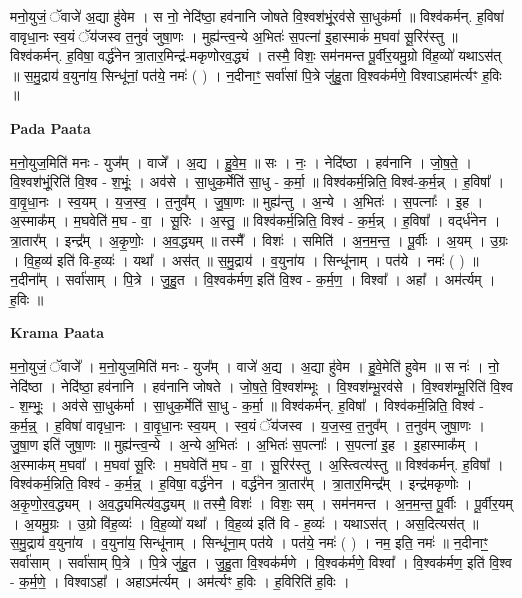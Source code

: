 \documentclass[17pt]{extarticle}
\begin{document}
मनो॒युजं॒ ॅवाजे॑ अ॒द्या हु॑वेम । स नो॒ नेदि॑ष्ठा॒ हव॑नानि जोषते वि॒श्वश॑भूं॒रव॑से सा॒धुक॑र्मा ॥ विश्व॑कर्मन्. ह॒विषा॑ वावृधा॒नः स्व॒यं ॅय॑जस्व त॒नुवं॑ जुषा॒णः । मुह्य॑न्त्व॒न्ये अ॒भितः॑ स॒पत्ना॑ इ॒हास्माकं॑ म॒घवा॑ सू॒रिर॑स्तु ॥ विश्व॑कर्मन्. ह॒विषा॒ वर्द्ध॑नेन त्रा॒तार॒मिन्द्र॑-मकृणोरव॒द्ध्यं । तस्मै॒ विशः॒ सम॑नमन्त पू॒र्वीर॒यमु॒ग्रो वि॑ह॒व्यो॑ यथाऽस॑त् ॥ स॒मु॒द्राय॑ व॒युना॑य॒ सिन्धू॑नां॒ पत॑ये॒ नमः॑ ( ) । न॒दीनाꣳ॒॒ सर्वा॑सां पि॒त्रे जु॑हु॒ता वि॒श्वक॑र्मणे॒ विश्वाऽहाम॑र्त्यꣳ ह॒विः ॥ \newline

\textbf{Pada Paata} \newline

म॒नो॒युज॒मिति॑ मनः - युज᳚म् । वाजे᳚ । अ॒द्य । हु॒वे॒म॒ ॥ सः । नः॒ । नेदि॑ष्ठा । हव॑नानि । जो॒ष॒ते॒ । वि॒श्वश॑भूं॒रिति॑ वि॒श्व - श॒भूंः॒ । अव॑से । सा॒धुक॒र्मेति॑ सा॒धु - क॒र्मा॒ ॥ विश्व॑कर्म॒न्निति॒ विश्व॑-क॒र्म॒न्न् । ह॒विषा᳚ । वा॒वृ॒धा॒नः । स्व॒यम् । य॒ज॒स्व॒ । त॒नुव᳚म् । जु॒षा॒णः ॥ मुह्य॑न्तु । अ॒न्ये । अ॒भितः॑ । स॒पत्नाः᳚ । इ॒ह । अ॒स्माक᳚म् । म॒घवेति॑ म॒घ - वा॒ । सू॒रिः । अ॒स्तु॒ ॥ विश्व॑कर्म॒न्निति॒ विश्व॑ - क॒र्म॒न्न् । ह॒विषा᳚ । वद्‌र्ध॑नेन । त्रा॒तार᳚म् । इन्द्र᳚म् । अ॒कृ॒णोः॒ । अ॒व॒द्ध्यम् ॥ तस्मै᳚ । विशः॑ । समिति॑ । अ॒न॒म॒न्त॒ । पू॒र्वीः । अ॒यम् । उ॒ग्रः । वि॒ह॒व्य॑ इति॑ वि-ह॒व्यः॑ । यथा᳚ । अस॑त् ॥ स॒मु॒द्राय॑ । व॒युना॑य । सिन्धू॑नाम् । पत॑ये । नमः॑ ( ) ॥ न॒दीना᳚म् । सर्वा॑साम् । पि॒त्रे । जु॒हु॒त । वि॒श्वक॑र्मण॒ इति॑ वि॒श्व - क॒र्म॒ण॒ । विश्वा᳚ । अहा᳚ । अम॑र्त्यम् । ह॒विः ॥  \newline


\textbf{Krama Paata} \newline

म॒नो॒युजं॒ ॅवाजे᳚ । म॒नो॒युज॒मिति॑ मनः - युज᳚म् । वाजे॑ अ॒द्य । अ॒द्या हु॑वेम । हु॒वे॒मेति॑ हुवेम ॥ स नः॑ । नो॒ नेदि॑ष्ठा । नेदि॑ष्ठा॒ हव॑नानि । हव॑नानि जोषते । जो॒ष॒ते॒ वि॒श्वश॑म्भूः । वि॒श्वश॑म्भू॒रव॑से । वि॒श्वश॑म्भू॒रिति॑ वि॒श्व - श॒म्भूः॒ । अव॑से सा॒धुक॑र्मा । सा॒धुक॒र्मेति॑ सा॒धु - क॒र्मा॒ ॥ विश्व॑कर्मन्. ह॒विषा᳚ । विश्व॑कर्म॒न्निति॒ विश्व॑ - क॒र्म॒न्न्॒ । ह॒विषा॑ वावृधा॒नः । वा॒वृ॒धा॒नः स्व॒यम् । स्व॒यं ॅय॑जस्व । य॒ज॒स्व॒ त॒नुव᳚म् । त॒नुव॑म् जुषा॒णः । जु॒षा॒ण इति॑ जुषा॒णः ॥ मुह्य॑न्त्व॒न्ये । अ॒न्ये अ॒भितः॑ । अ॒भितः॑ स॒पत्नाः᳚ । स॒पत्ना॑ इ॒ह । इ॒हास्माक᳚म् । अ॒स्माक॑म् म॒घवा᳚ । म॒घवा॑ सू॒रिः । म॒घवेति॑ म॒घ - वा॒ । सू॒रिर॑स्तु । अ॒स्त्वित्य॑स्तु ॥ विश्व॑कर्मन्. ह॒विषा᳚ । विश्व॑कर्म॒न्निति॒ विश्व॑ - क॒र्म॒न्न्॒ । ह॒विषा॒ वर्द्ध॑नेन । वर्द्ध॑नेन त्रा॒तार᳚म् । त्रा॒तार॒मिन्द्र᳚म् । इन्द्र॑मकृणोः । अ॒कृ॒णो॒र॒व॒द्ध्यम् । अ॒व॒द्ध्यमित्य॑व॒द्ध्यम् ॥ तस्मै॒ विशः॑ । विशः॒ सम् । सम॑नमन्त । अ॒न॒म॒न्त॒ पू॒र्वीः । पू॒र्वीर॒यम् । अ॒यमु॒ग्रः । उ॒ग्रो वि॑ह॒व्यः॑ । वि॒ह॒व्यो॑ यथा᳚ । वि॒ह॒व्य॑ इति॑ वि - ह॒व्यः॑ । यथाऽस॑त् । अस॒दित्यस॑त् ॥ स॒मु॒द्राय॑ व॒युना॑य । व॒युना॑य॒ सिन्धू॑नाम् । सिन्धू॑ना॒म् पत॑ये । पत॑ये॒ नमः॑ ( ) । नम॒ इति॒ नमः॑ ॥ न॒दीनाꣳ॒॒ सर्वा॑साम् । सर्वा॑साम् पि॒त्रे । पि॒त्रे जु॑हु॒त । जु॒हु॒ता वि॒श्वक॑र्मणे । वि॒श्वक॑र्मणे॒ विश्वा᳚ । वि॒श्वक॑र्मण॒ इति॑ वि॒श्व - क॒र्म॒णे॒ । विश्वाऽहा᳚ । अहाऽम॑र्त्यम् । अम॑र्त्यꣳ ह॒विः । ह॒विरिति॑ ह॒विः । \newline
\end{document}
